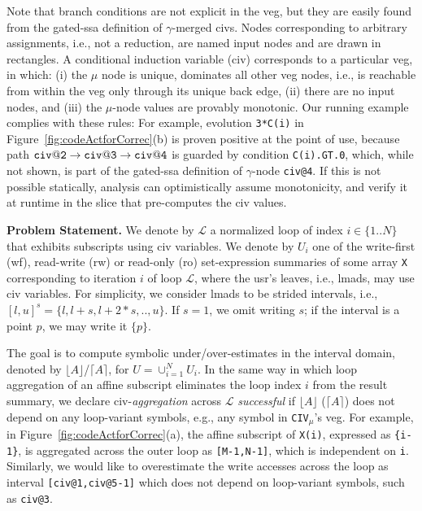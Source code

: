 \documentclass[10pt,nocopyrightspace]{sigplanconf}
\begin{document}
Note that branch conditions are not explicit in the {\sc veg}, 
but they are easily found from the gated-{\sc ssa} definition 
of $\gamma$-merged {\sc civ}s.  
%
Nodes corresponding to arbitrary assignments, i.e., not a reduction, 
are named input nodes and are drawn in rectangles. 
%
A conditional induction variable ({\sc civ}) corresponds to a
particular {\sc veg}, in which:
  (i) the $\mu$ node is unique, dominates all other {\sc veg} nodes,
            i.e., is reachable from within the {\sc veg} only through its
            unique back edge, 
%
 (ii) there are no input nodes, and 
%
(iii) the $\mu$-node values are provably monotonic.
%
Our running example complies with these rules:
For example, evolution {\tt 3*C(i)} in 
Figure~\ref{fig:codeActforCorrec}(b) is proven positive at the 
point of use, because path 
${\tt civ@2}\rightarrow{\tt civ@3}\rightarrow{\tt civ@4}$
is guarded by condition {\tt C(i).GT.0}, which, while not 
shown, is part of the gated-{\sc ssa} definition of $\gamma$-node {\tt civ@4}. 
%
If this is not possible statically, analysis can optimistically
assume monotonicity, and verify it at runtime in the slice 
that pre-computes the {\sc civ} values. 

\vspace{1ex}

{\bf  Problem Statement.}
%
We denote by $\mathcal{L}$ a normalized loop of index $i\in\{1..N\}$ that
exhibits subscripts using {\sc civ} variables.
%
We denote by $U_i$ one of the write-first ({\sc wf}), read-write ({\sc rw})
or read-only ({\sc ro}) set-expression summaries of some array {\tt X} 
corresponding to iteration $i$ of loop $\mathcal{L}$, where the {\sc usr}'s 
leaves, i.e., {\sc lmad}s, may use {\sc civ} variables. 
%
For simplicity, we consider {\sc lmad}s to be 
strided intervals, i.e., $[l,u]^s=\{l, l+s, l+2*s, .., u\}$.
If $s=1$, we omit writing $s$; if the interval 
is a point $p$, we may write it $\{p\}$.

The goal is to compute symbolic under/over-estimates in the 
interval domain, denoted by $\lfloor A \rfloor$/$\lceil A \rceil$, 
for $U = \cup_{i=1}^{N} U_i$.
%
In the same way in which loop aggregation of an affine subscript  
eliminates the loop index $i$ from the result summary,
we declare {\sc civ}-{\em aggregation} across $\mathcal{L}$ {\em successful} 
if $\lfloor A \rfloor$ ($\lceil A \rceil$) does not depend on any loop-variant
symbols, e.g., any symbol in {\tt CIV}$_{\mu}$'s  {\sc veg}. 
%
For example, in Figure~\ref{fig:codeActforCorrec}(a), the affine
subscript of {\tt X(i)}, expressed as {\tt\{i-1\}}, is aggregated across 
the outer loop as {\tt[M-1,N-1]}, which is independent on {\tt i}. 
Similarly, we would like to overestimate the write accesses   
across the loop as interval {\tt[civ@1,civ@5-1]} which does
not depend on loop-variant symbols, such as {\tt civ@3}.
\end{document}
